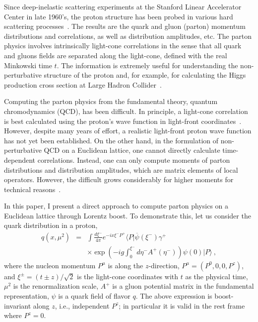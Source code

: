 
Since deep-inelastic scattering experiments at the Stanford Linear Accelerator Center
in late 1960's, the proton structure has been probed in various hard
scattering processes~\cite{Gao:2013xoa}. The results are the quark and gluon (parton) momentum
distributions and correlations, as well as distribution amplitudes, etc. The parton
physics involves intrinsically light-cone correlations in the sense that
all quark and gluons fields are separated along the light-cone, defined with the real
Minkowski time $t$. The information is extremely useful for
understanding the non-perturbative structure of the proton and, for example,
for calculating the Higgs production cross section at Large Hadron Collider~\cite{science}.

Computing the parton physics from the fundamental theory, quantum chromodynamics (QCD),
has been difficult. In principle, a light-cone correlation is best calculated using
the proton's wave function in light-front coordinates~\cite{brodsky}. However, despite many years
of effort, a realistic light-front proton wave function has not yet been established.
On the other hand, in the formulation of non-perturbative QCD on a Euclidean lattice, one cannot directly calculate
time-dependent correlations. Instead, one can only compute moments of parton distributions and distribution amplitudes,
which are matrix elements of local operators. However, the difficult
grows considerably for higher moments for technical reasons~\cite{negele}.

In this paper, I present a direct approach to compute parton physics on a Euclidean lattice
through Lorentz boost. To demonstrate
this, let us consider the quark distribution in a proton,
\begin{eqnarray}
   q(x, \mu^2) &=& \int \frac{d\xi^-}{4\pi} e^{-ix\xi^-P^+}  \langle P|\overline{\psi}(\xi^-)
   \gamma^+ \\
   && \times \exp\left(-ig\int^{\xi^-}_0 d\eta^- A^+(\eta^-) \right)\psi(0) |P\rangle \nonumber \ ,
\end{eqnarray}
where the nucleon momentum $P^\mu$ is along the $z$-direction, $P^\mu = (P^0, 0, 0, P^z)$, and $\xi^\pm
=(t \pm z)/\sqrt{2}$ is the light-cone coordinates with $t$ as the physical time, $\mu^2$ is the renormalization scale, $A^+$
is a gluon potential matrix in the fundamental representation, $\psi$ is a quark field of flavor $q$. The
above expression is boost-invariant along $z$, i.e., independent $P^z$; in particular it is valid in the rest frame
where $P^z=0$.

